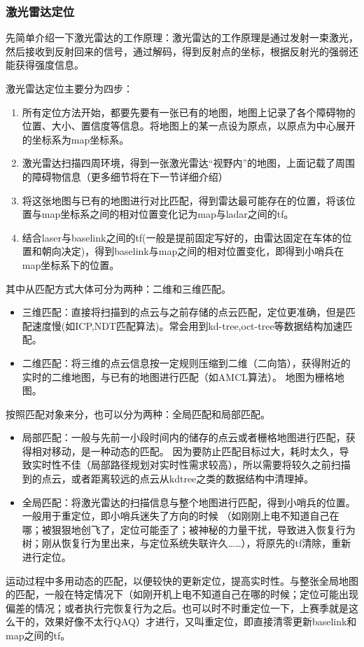 \subsubsection{ 激光雷达定位}
先简单介绍一下激光雷达的工作原理：激光雷达的工作原理是通过发射一束激光，然后接收到反射回来的信号，通过解码，得到反射点的坐标，根据反射光的强弱还能获得强度信息。

激光雷达定位主要分为四步：
\begin{enumerate}
\item 所有定位方法开始，都要先要有一张已有的地图，地图上记录了各个障碍物的位置、大小、置信度等信息。将地图上的某一点设为原点，以原点为中心展开的坐标系为map坐标系。
\item 激光雷达扫描四周环境，得到一张激光雷达“视野内”的地图，上面记载了周围的障碍物信息（更多细节将在下一节详细介绍）
\item 将这张地图与已有的地图进行对比匹配，得到雷达最可能存在的位置，将该位置与map坐标系之间的相对位置变化记为map与ladar之间的tf。
\item 结合laser与baselink之间的tf(一般是提前固定写好的，由雷达固定在车体的位置和朝向决定)，得到baselink与map之间的相对位置变化，即得到小哨兵在map坐标系下的位置。
\end{enumerate}
其中从匹配方式大体可分为两种：二维和三维匹配。
\begin{itemize}

\item 三维匹配：直接将扫描到的点云与之前存储的点云匹配，定位更准确，但是匹配速度慢(如ICP,NDT匹配算法)。常会用到kd-tree,oct-tree等数据结构加速匹配。
\item 二维匹配：将三维的点云信息按一定规则压缩到二维（二向箔），获得附近的实时的二维地图，与已有的地图进行匹配（如AMCL算法）。
                地图为栅格地图。
\end{itemize}
按照匹配对象来分，也可以分为两种：全局匹配和局部匹配。
\begin{itemize}
        \item 局部匹配：一般与先前一小段时间内的储存的点云或者栅格地图进行匹配，获得相对移动，是一种动态的匹配。
        因为要防止匹配目标过大，耗时太久，导致实时性不佳（局部路径规划对实时性需求较高），所以需要将较久之前扫描到的点云，或者距离较远的点云从kdtree之类的数据结构中清理掉。
        \item 全局匹配：将激光雷达的扫描信息与整个地图进行匹配，得到小哨兵的位置。一般用于重定位，即小哨兵迷失了方向的时候
                （如刚刚上电不知道自己在哪；被狠狠地创飞了，定位可能歪了；被神秘的力量干扰，导致进入恢复行为树；刚从恢复行为里出来，与定位系统失联许久……），将原先的tf清除，重新进行定位。
\end{itemize}
运动过程中多用动态的匹配，以便较快的更新定位，提高实时性。与整张全局地图的匹配，一般在特定情况下（如刚开机上电不知道自己在哪的时候；定位可能出现偏差的情况；或者执行完恢复行为之后。也可以时不时重定位一下，上赛季就是这么干的，效果好像不太行QAQ）才进行，又叫重定位，即直接清零更新baselink和map之间的tf。
